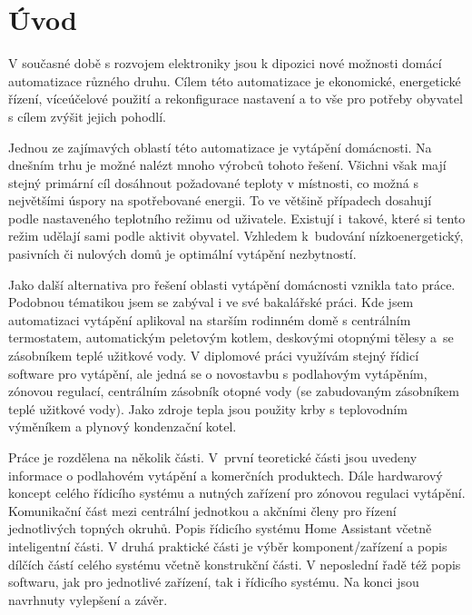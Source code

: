 \chapter{Úvod}

V současné době s rozvojem elektroniky jsou k dipozici nové možnosti domácí automatizace různého druhu. Cílem této automatizace je ekonomické, energetické řízení, víceúčelové použití a rekonfigurace nastavení a to vše pro potřeby obyvatel s cílem zvýšit jejich pohodlí.


Jednou ze zajímavých oblastí této automatizace je vytápění domácnosti. Na dnešním trhu je možné nalézt mnoho výrobců tohoto řešení. Všichni však mají stejný primární cíl dosáhnout požadované teploty v místnosti, co možná s největšími úspory na spotřebované energii. To ve většině případech dosahují podle nastaveného teplotního režimu od uživatele. Existují i~takové, které si tento režim udělají sami podle aktivit obyvatel. Vzhledem k~budování nízkoenergetický, pasivních či nulových domů je optimální vytápění nezbytností.

Jako další alternativa pro řešení oblasti vytápění domácnosti vznikla tato práce. Podobnou tématikou jsem se zabýval i ve své bakalářské práci. Kde jsem automatizaci vytápění aplikoval na starším rodinném domě s centrálním termostatem, automatickým peletovým kotlem, deskovými otopnými tělesy a~se zásobníkem teplé užitkové vody. V diplomové práci využívám stejný řídicí software pro vytápění, ale jedná se o novostavbu s podlahovým vytápěním, zónovou regulací, centrálním zásobník otopné vody (se zabudovaným zásobníkem teplé užitkové vody). Jako zdroje tepla jsou použity krby s teplovodním výměníkem a plynový kondenzační kotel.

Práce je rozdělena na několik části. V~první teoretické části jsou uvedeny informace o podlahovém vytápění a komerčních produktech. Dále hardwarový koncept celého řídicího systému a nutných zařízení pro zónovou regulaci vytápění. Komunikační část mezi centrální jednotkou a akčními členy pro řízení jednotlivých topných okruhů. Popis řídicího systému Home Assistant včetně inteligentní části. V druhá praktické části je výběr komponent/zařízení a popis dílčích částí celého systému včetně konstrukční části. V neposlední řadě též popis softwaru, jak pro jednotlivé zařízení, tak i řídicího systému. Na konci jsou navrhnuty vylepšení a závěr.

